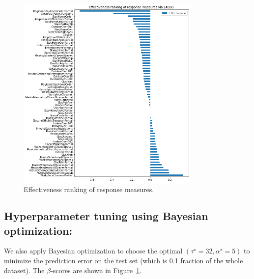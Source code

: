 \documentclass[11pt]{article}
\begin{document}
\begin{figure}[!hbt]
\centering
\includegraphics[width=0.8\textwidth]{eff_lasso.png}
         \caption{Effectiveness ranking of response measures.}
         \label{fig:eff_lasso}
\end{figure}

\subsection*{Hyperparameter tuning using Bayesian optimization:} We also apply Bayesian optimization to choose the optimal $(\tau^\star = 32, \alpha^\star = 5)$ to minimize the prediction error on the test set (which is 0.1 fraction of the whole dataset). The $\beta$-scores are shown in Figure~\ref{fig:eff_lasso}. 
\end{document}
